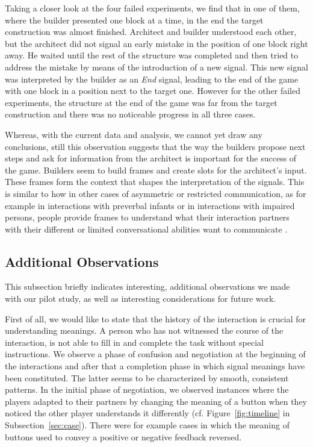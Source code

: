 Taking a closer look at the four failed experiments, we find that in one of them, where the builder presented one block at a time, in the end the target construction was almost finished. Architect and builder understood each other, but the architect did not signal an early mistake in the position of one block right away. He waited until the rest of the structure was completed and then tried to address the mistake by means of the introduction of a new signal. This new signal was interpreted by the builder as an \emph{End} signal, leading to the end of the game with one block in a position next to the target one. However for the other failed experiments, the structure at the end of the game was far from the target construction and there was no noticeable progress in all three cases.

Whereas, with the current data and analysis, we cannot yet draw any conclusions, still this observation suggests that the way the builders propose next steps and ask for information from the architect is important for the success of the game. Builders seem to build frames and create slots for the architect's input. These frames form the context that shapes the interpretation of the signals. This is similar to how in other cases of asymmetric or restricted communication, as for example in interactions with preverbal infants or in interactions with impaired persons, people provide frames to understand what their interaction partners with their different or limited conversational abilities want to communicate \cite{ochs1979propositions, goodwin1995co}.

\subsection{Additional Observations}

This subsection briefly indicates interesting, additional observations we made with our pilot study, as well as interesting considerations for future work.

First of all, we would like to state that the history of the interaction is crucial for understanding meanings. A person who has not witnessed the course of the interaction, is not able to fill in and complete the task without special instructions. We observe a phase of confusion and negotiation at the beginning of the interactions and after that a completion phase in which signal meanings have been constituted. The latter seems to be characterized by smooth, consistent patterns. In the initial phase of negotiation, we observed instances where the players adapted to their partners by changing the meaning of a button when they noticed the other player understands it differently (cf. Figure~\ref{fig:timeline} in Subsection~\ref{sec:case}). There were for example cases in which the meaning of buttons used to convey a positive or negative feedback reversed.

